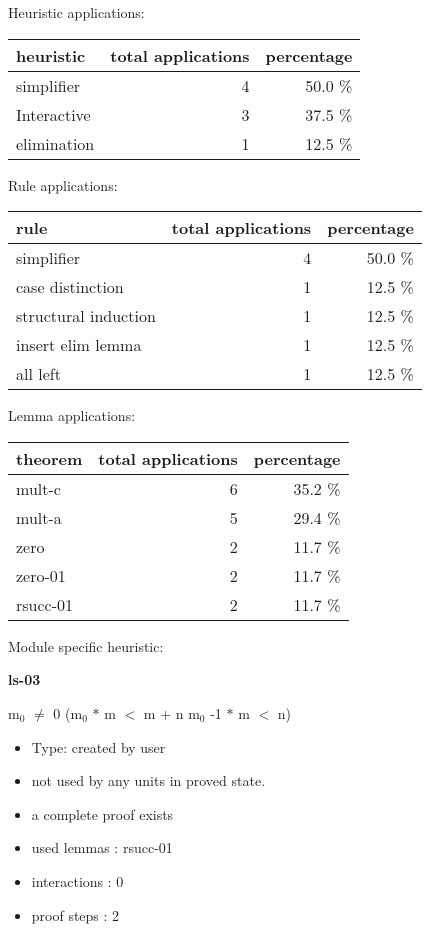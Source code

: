 \documentclass[a4paper]{article}
\begin{document}
\medskip


Heuristic applications:

\begin{supertabular}{l|r|r}
heuristic	& total applications & percentage \\ \hline
simplifier & 4 & 50.0 \% \\
Interactive & 3 & 37.5 \% \\
elimination & 1 & 12.5 \% \\

\end{supertabular}

Rule applications:

\begin{supertabular}{l|r|r}
rule	        & total applications & percentage \\ \hline
simplifier & 4 & 50.0 \% \\
case distinction & 1 & 12.5 \% \\
structural induction & 1 & 12.5 \% \\
insert elim lemma & 1 & 12.5 \% \\
all left & 1 & 12.5 \% \\

\end{supertabular}

Lemma applications:

\begin{supertabular}{l|r|r}
theorem	        & total applications & percentage \\ \hline
mult-c & 6 & 35.2 \% \\
mult-a & 5 & 29.4 \% \\
zero & 2 & 11.7 \% \\
zero-01 & 2 & 11.7 \% \\
rsucc-01 & 2 & 11.7 \% \\

\end{supertabular}

Module specific heuristic:

\pagebreak

{\LARGE\bf ls-03}\label{lemma-ls-03}

\medskip

 \Fol $\mbox{m}_{0}$ $\neq$ 0 \Imp ($\mbox{m}_{0}$ $*$ m $<$ m + n \Equiv $\mbox{m}_{0}$ -1 $*$ m $<$ n)

\begin{itemize}

\item Type: created by user

\item not used by any units in proved state.
\item       a complete proof exists
\item       used lemmas  : rsucc-01
\item       interactions : 0
\item       proof steps  : 2
\end{itemize}
\end{document}
